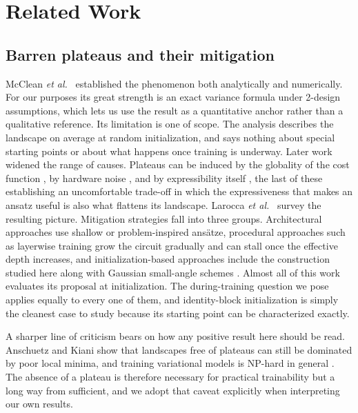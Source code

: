 \documentclass[conference]{IEEEtran}%
\begin{document}
\section{Related Work}
\subsection{Barren plateaus and their mitigation}
McClean \emph{et al.}~\cite{mcclean} established the phenomenon both analytically and numerically. For our purposes its great strength is an exact variance formula under 2-design assumptions, which lets us use the result as a quantitative anchor rather than a qualitative reference. Its limitation is one of scope. The analysis describes the landscape on average at random initialization, and says nothing about special starting points or about what happens once training is underway. Later work widened the range of causes. Plateaus can be induced by the globality of the cost function \cite{cerezo}, by hardware noise \cite{wang}, and by expressibility itself \cite{holmes}, the last of these establishing an uncomfortable trade-off in which the expressiveness that makes an ansatz useful is also what flattens its landscape. Larocca \emph{et al.}~\cite{larocca} survey the resulting picture. Mitigation strategies fall into three groups. Architectural approaches use shallow or problem-inspired ansätze, procedural approaches such as layerwise training \cite{skolik} grow the circuit gradually and can stall once the effective depth increases, and initialization-based approaches include the construction studied here \cite{grant} along with Gaussian small-angle schemes \cite{zhang}. Almost all of this work evaluates its proposal at initialization. The during-training question we pose applies equally to every one of them, and identity-block initialization is simply the cleanest case to study because its starting point can be characterized exactly.

A sharper line of criticism bears on how any positive result here should be read. Anschuetz and Kiani \cite{anschuetz} show that landscapes free of plateaus can still be dominated by poor local minima, and training variational models is NP-hard in general \cite{bittel}. The absence of a plateau is therefore necessary for practical trainability but a long way from sufficient, and we adopt that caveat explicitly when interpreting our own results.
\end{document}
